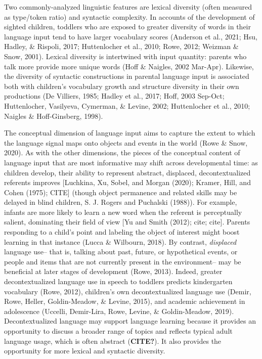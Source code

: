 \documentclass[
  man,floatsintext]{apa6}
\begin{document}
Two commonly-analyzed linguistic features are lexical diversity (often measured as type/token ratio) and syntactic complexity. In accounts of the development of sighted children, toddlers who are exposed to greater diversity of words in their language input tend to have larger vocabulary scores (Anderson et al., 2021; Hsu, Hadley, \& Rispoli, 2017; Huttenlocher et al., 2010; Rowe, 2012; Weizman \& Snow, 2001). Lexical diversity is intertwined with input quantity: parents who talk more provide more unique words (Hoff \& Naigles, 2002 Mar-Apr). Likewise, the diversity of syntactic constructions in parental language input is associated both with children's vocabulary growth and structure diversity in their own productions (De Villiers, 1985; Hadley et al., 2017; Hoff, 2003 Sep-Oct; Huttenlocher, Vasilyeva, Cymerman, \& Levine, 2002; Huttenlocher et al., 2010; Naigles \& Hoff-Ginsberg, 1998).

The conceptual dimension of language input aims to capture the extent to which the language signal maps onto objects and events in the world (Rowe \& Snow, 2020). As with the other dimensions, the pieces of the conceptual content of language input that are most informative may shift across developmental time: as children develop, their ability to represent abstract, displaced, decontextualized referents improves {[}Luchkina, Xu, Sobel, and Morgan (2020); Kramer, Hill, and Cohen (1975); CITE{]} (though object permanence and related skills may be delayed in blind children, S. J. Rogers and Puchalski (1988)). For example, infants are more likely to learn a new word when the referent is perceptually salient, dominating their field of view {[}Yu and Smith (2012); cite; cite{]}. Parents responding to a child's point and labeling the object of interest might boost learning in that instance (Lucca \& Wilbourn, 2018). By contrast, \emph{displaced} language use-- that is, talking about past, future, or hypothetical events, or people and items that are not currently present in the environment-- may be beneficial at later stages of development (Rowe, 2013). Indeed, greater decontextualized language use in speech to toddlers predicts kindergarten vocabulary (Rowe, 2012), children's own decontextualized language use (Demir, Rowe, Heller, Goldin-Meadow, \& Levine, 2015), and academic achievement in adolescence (Uccelli, Demir-Lira, Rowe, Levine, \& Goldin-Meadow, 2019). Decontextualized language may support language learning because it provides an opportunity to discuss a broader range of topics and reflects typical adult language usage, which is often abstract (\textbf{CITE?}). It also provides the opportunity for more lexical and syntactic diversity.
\end{document}
